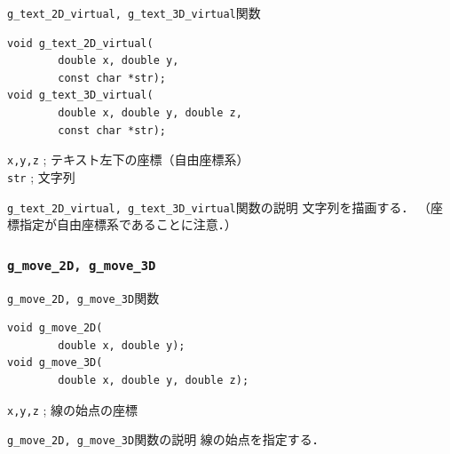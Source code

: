 \documentclass[platex,a4paper,12pt]{jsarticle}%
\begin{document}
\begin{itembox}[l]{\texttt{g\_text\_2D\_virtual, g\_text\_3D\_virtual}関数}
\begin{verbatim}
void g_text_2D_virtual(
        double x, double y,
        const char *str);
void g_text_3D_virtual(
        double x, double y, double z,
        const char *str);      
\end{verbatim}
\verb|x,y,z| ; テキスト左下の座標（自由座標系）\\
\verb|str| ; 文字列
\end{itembox}

\begin{itembox}[l]{\texttt{g\_text\_2D\_virtual, g\_text\_3D\_virtual}関数の説明}
文字列を描画する．
（座標指定が自由座標系であることに注意．）
\end{itembox}

\begin{figure}[htb]
\end{figure}




\clearpage
\subsubsection{\texttt{g\_move\_2D, g\_move\_3D}}

\begin{itembox}[l]{\texttt{g\_move\_2D, g\_move\_3D}関数}
\begin{verbatim}
void g_move_2D(
        double x, double y);
void g_move_3D(
        double x, double y, double z);     
\end{verbatim}
\verb|x,y,z| ; 線の始点の座標\\
\end{itembox}

\begin{itembox}[l]{\texttt{g\_move\_2D, g\_move\_3D}関数の説明}
線の始点を指定する．
\end{itembox}
\end{document}
